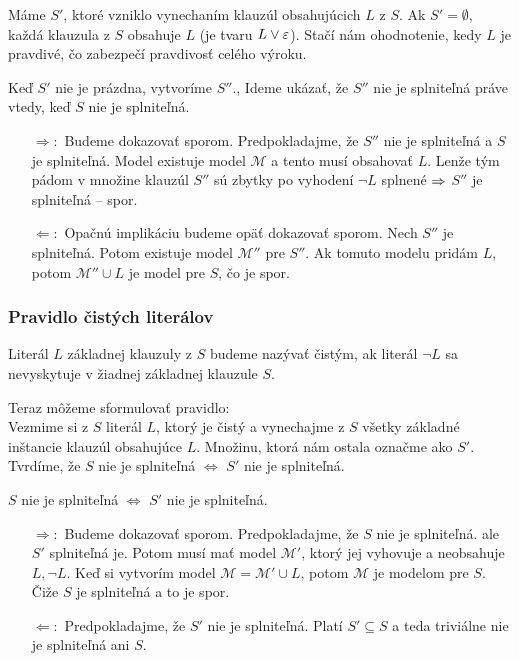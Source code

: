 \begin{dokaz}
    Máme $S'$, ktoré vzniklo vynechaním klauzúl obsahujúcich $L$ z $S$.
    Ak $S'=\emptyset$, každá klauzula z $S$ obsahuje $L$ 
    (je tvaru $L \lor \varepsilon$).
    Stačí nám ohodnotenie, kedy $L$ je pravdivé, čo zabezpečí
    pravdivosť celého výroku. 

    Keď $S'$ nie je prázdna, vytvoríme $S''$.,
    Ideme ukázať, že $S''$ nie je splniteľná práve vtedy,
    keď $S$ nie je splniteľná.

    \begin{itemize}
    \item[$\Rightarrow:$] Budeme dokazovať sporom.
        Predpokladajme, že $S''$ nie je splniteľná a $S$ je splniteľná.
        Model existuje model $\mathcal{M}$ a tento musí obsahovať $L$.
        Lenže tým pádom v množine klauzúl $S''$ sú zbytky po vyhodení
        $\neg L$ splnené $\Rightarrow$ $S''$ je splniteľná -- spor.

    \item[$\Leftarrow:$] Opačnú implikáciu budeme opäť dokazovať sporom.
        Nech $S''$ je splniteľná. Potom existuje model
        $\mathcal{M}''$ pre $S''$. Ak tomuto modelu pridám $L$, potom
        $\mathcal{M}'' \cup L$ je model pre $S$, čo je spor.
    \end{itemize}
\end{dokaz}
\subsubsection{Pravidlo čistých literálov}

\begin{definicia}
    Literál $L$ základnej klauzuly z $S$ budeme nazývať čistým,
    ak literál $\neg L$ sa nevyskytuje v žiadnej základnej klauzule $S$.
\end{definicia}

\noindent
Teraz môžeme sformulovať pravidlo: \\
Vezmime si z $S$ literál $L$, ktorý je čistý
a vynechajme z $S$ všetky základné inštancie klauzúl obsahujúce $L$.
Množinu, ktorá nám ostala označme ako $S'$.
Tvrdíme, že $S$ nie je splniteľná $\iff$ $S'$ nie je splniteľná.


\begin{dokaz}
    $S$ nie je splniteľná $\iff$ $S'$ nie je splniteľná.
    \begin{itemize}
    \item[$\Rightarrow:$] Budeme dokazovať sporom.
        Predpokladajme, že $S$ nie je splniteľná.
        ale $S'$ splniteľná je. Potom musí mať
        model $\mathcal{M}'$, ktorý jej vyhovuje a neobsahuje
        $L, \neg L$.  Keď si vytvorím model $\mathcal{M}=\mathcal{M}'\cup L$,
        potom $\mathcal{M}$ je modelom pre $S$. Čiže
        $S$ je splniteľná a to je spor.

    \item[$\Leftarrow:$] Predpokladajme, že
        $S'$ nie je splniteľná. Platí $S' \subseteq S$ a teda
        triviálne nie je splniteľná ani $S$.
    \end{itemize}
\end{dokaz}

